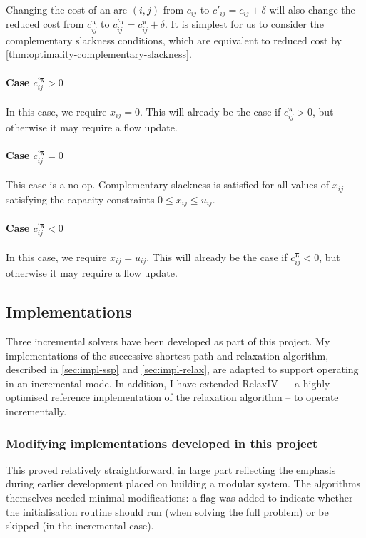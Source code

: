 Changing the cost of an arc $(i,j)$ from $c_{ij}$ to $c'_{ij} = c_{ij} + \delta$ will also change the reduced cost from $c_{ij}^{\boldsymbol{\pi}}$ to $c_{ij}^{\prime\boldsymbol{\pi}} = c_{ij}^{\boldsymbol{\pi}} + \delta$. It is simplest for us to consider the complementary slackness conditions, which are equivalent to reduced cost by \cref{thm:optimality-complementary-slackness}.

\paragraph{Case $c_{ij}^{\prime\boldsymbol{\pi}} > 0$}
In this case, we require $x_{ij} = 0$. This will already be the case if $c_{ij}^{\boldsymbol{\pi}} > 0$, but otherwise it may require a flow update.

\paragraph{Case $c_{ij}^{\prime\boldsymbol{\pi}} = 0$}
This case is a no-op. Complementary slackness is satisfied for all values of $x_{ij}$ satisfying the capacity constraints $0 \leq x_{ij} \leq u_{ij}$.

\paragraph{Case $c_{ij}^{\prime\boldsymbol{\pi}} < 0$}
In this case, we require $x_{ij} = u_{ij}$. This will already be the case if $c_{ij}^{\boldsymbol{\pi}} < 0$, but otherwise it may require a flow update.

\subsection{Implementations} \label{sec:impl-incremental-impl}

Three incremental solvers have been developed as part of this project. My implementations of the successive shortest path and relaxation algorithm, described in \cref{sec:impl-ssp} and \cref{sec:impl-relax}, are adapted to support operating in an incremental mode. In addition, I have extended RelaxIV~\cite{BertsekasCodes:1988,RelaxIV:2011} -- a highly optimised reference implementation of the relaxation algorithm -- to operate incrementally.

\subsubsection{Modifying implementations developed in this project}
This proved relatively straightforward, in large part reflecting the emphasis during earlier development placed on building a modular system. The algorithms themselves needed minimal modifications: a flag was added to indicate whether the initialisation routine should run (when solving the full problem) or be skipped (in the incremental case). 

